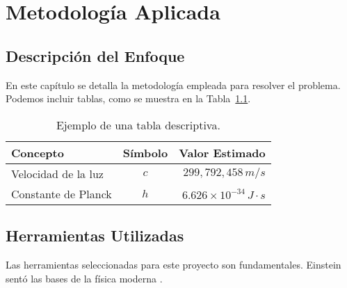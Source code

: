 \chapter{Metodología Aplicada}
\label{chap:metodos}

\section{Descripción del Enfoque}
\label{sec:metodologia}
En este capítulo se detalla la metodología empleada para resolver el problema.
Podemos incluir tablas, como se muestra en la Tabla~\ref{tab:ejemplo}.

\begin{table}[h!]
    \centering
    \caption{Ejemplo de una tabla descriptiva.}
    \label{tab:ejemplo}
    \begin{tabular}{|l|c|r|}
        \hline
        \textbf{Concepto} & \textbf{Símbolo} & \textbf{Valor Estimado} \\ \hline
        Velocidad de la luz & $c$ & $299,792,458 \, m/s$ \\
        Constante de Planck & $h$ & $6.626 \times 10^{-34} \, J \cdot s$ \\ \hline
    \end{tabular}
\end{table}

\section{Herramientas Utilizadas}
Las herramientas seleccionadas para este proyecto son fundamentales. Einstein sentó las bases de la física moderna \cite{einstein1905}.